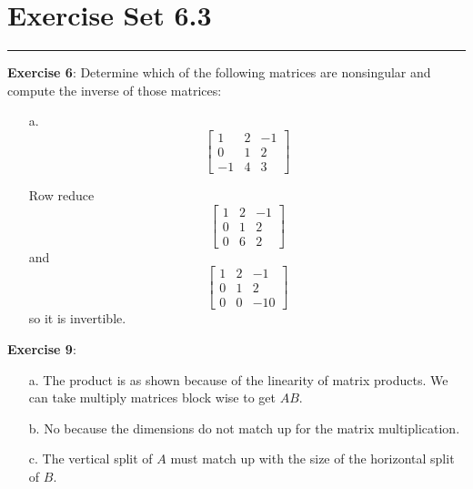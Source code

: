 \documentclass{article}
\begin{document}
\section*{Exercise Set 6.3}
\hrule

\textbf{Exercise 6}: Determine which of the following matrices are nonsingular and compute the inverse of those matrices:
    \begin{itemize}
        \item [a.] 
            \begin{equation*}
                \begin{bmatrix}
                    1  & 2 & -1 \\
                    0  & 1 & 2  \\
                    -1 & 4 & 3    
                \end{bmatrix}
            \end{equation*}
            \begin{answer}
                Row reduce
                    \begin{equation*}
                        \begin{bmatrix}
                            1 & 2 & -1 \\
                            0 & 1 & 2  \\
                            0 & 6 & 2    
                        \end{bmatrix}
                    \end{equation*}
                and
                    \begin{equation*}
                        \begin{bmatrix}
                            1 & 2 & -1  \\
                            0 & 1 & 2   \\
                            0 & 0 & -10   
                        \end{bmatrix}
                    \end{equation*}
                so it is invertible.
            \end{answer}
    \end{itemize}

\textbf{Exercise 9}:
    \begin{itemize}
        \item [a.] The product is as shown because of the linearity of matrix products. We can take multiply matrices block wise to get $AB$.

        \item [b.] No because the dimensions do not match up for the matrix multiplication.

        \item [c.] The vertical split of $A$ must match up with the size of the horizontal split of $B$.
    \end{itemize}
\end{document}
